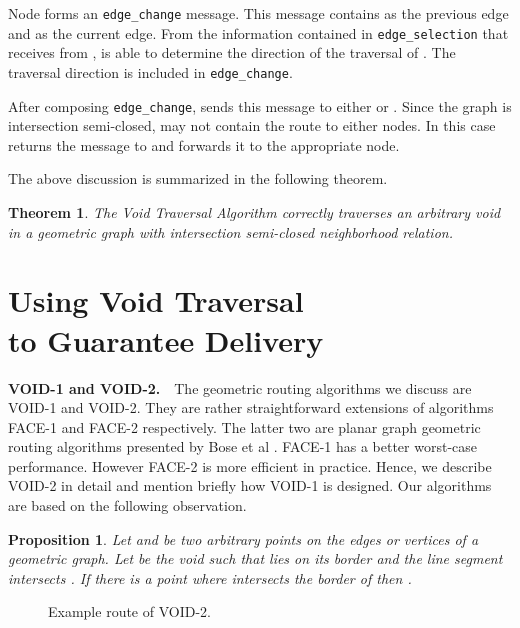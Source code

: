 \documentclass[conference]{IEEEtran}
\newtheorem{proposition}{Proposition}
\newtheorem{theorem}{Theorem}
\def\TT#1{\texttt{#1}}
\begin{document}
Node  forms an \TT{edge\_change} message. This message contains
 as the previous edge and  as the current edge.  From
the information contained in \TT{edge\_selection} that  receives
from ,  is able to determine the direction of the traversal of
. The traversal direction is included in
\TT{edge\_change}. 

After composing \TT{edge\_change},  sends this message to either
 or .  Since the graph is intersection semi-closed,  may
not contain the route to either nodes. In this case  returns the
message to  and  forwards it to the appropriate node.

The above discussion is summarized in the following theorem.

\begin{theorem}\label{TraversalOK}
The Void Traversal Algorithm correctly traverses an arbitrary void in
a geometric graph with intersection semi-closed neighborhood relation.
\end{theorem}

\section{Using Void Traversal \\ to Guarantee Delivery}
\label{SecRouting}

\textbf{VOID-1 and VOID-2.}\ \ The geometric routing algorithms we
discuss are VOID-1 and VOID-2.  They are rather straightforward
extensions of algorithms FACE-1 and FACE-2 respectively. The latter
two are planar graph geometric routing algorithms presented by Bose et
al \cite{Bose01}.  FACE-1 has a better worst-case performance. However
FACE-2 is more efficient in practice. Hence, we describe VOID-2 in
detail and mention briefly how VOID-1 is designed. Our algorithms are
based on the following observation.

\begin{proposition}
Let  and  be two arbitrary points on the edges or
vertices of a geometric graph. Let  be the void such that 
lies on its border and the line segment  intersects . If
there is a point  where  intersects the border of 
then .
\end{proposition}

\begin{figure}
\center {}
\caption{Example route of VOID-2.}
\label{FigVoid2Pic} 
\end{figure}
\end{document}
